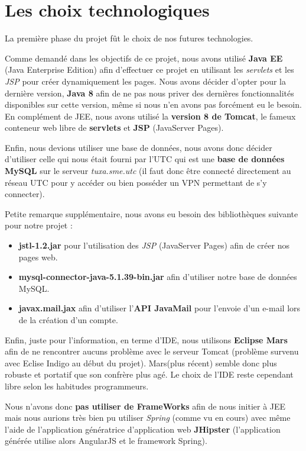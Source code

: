 \documentclass[a4paper]{article}
\begin{document}
\section{Les choix technologiques}
\label{sec:introduction}

La première phase du projet fût le choix de nos futures technologies.

Comme demandé dans les objectifs de ce projet, nous avons utilisé \textbf{Java EE} (Java Enterprise Edition) afin d'effectuer ce projet en utilisant les \textit{servlets} et les \textit{JSP} pour créer dynamiquement les pages. Nous avons décider d'opter pour la dernière version, \textbf{Java 8} afin de ne pas nous priver des dernières fonctionnalités disponibles sur cette version, même si nous n'en avons pas forcément eu le besoin.
En complément de JEE, nous avons utilisé la \textbf{version 8 de Tomcat}, le fameux conteneur web libre de \textbf{servlets} et \textbf{JSP} (JavaServer Pages).

Enfin, nous devions utiliser une base de données, nous avons donc décider d'utiliser celle qui nous était fourni par l'UTC qui est une \textbf{base de données MySQL} sur le serveur \textit{tuxa.sme.utc} (il faut donc être connecté directement au réseau UTC pour y accéder ou bien posséder un VPN permettant de s'y connecter).

Petite remarque supplémentaire, nous avons eu besoin des bibliothèques suivante pour notre projet :
\begin{itemize}
\item \textbf{jstl-1.2.jar} pour l'utilisation des \textit{JSP} (JavaServer Pages) afin de créer nos pages web.
\item \textbf{mysql-connector-java-5.1.39-bin.jar} afin d'utiliser notre base de données MySQL.
\item \textbf{javax.mail.jax} afin d'utiliser l'\textbf{API JavaMail} pour l'envoie d'un e-mail lors de la création d'un compte.
\end{itemize}

Enfin, juste pour l'information, en terme d'IDE, nous utilisons \textbf{Eclipse Mars} afin de ne rencontrer aucuns problème avec le serveur Tomcat (problème survenu avec Eclise Indigo au début du projet). Mars(plus récent) semble donc plus robuste et portatif que son confrère plus agé. Le choix de l'IDE reste cependant libre selon les habitudes programmeurs.

Nous n'avons donc \textbf{pas utiliser de FrameWorks} afin de nous initier à JEE mais nous aurions très bien pu utiliser \textit{Spring} (comme vu en cours) avec même l'aide de l'application génératrice d'application web \textbf{JHipster} (l'application générée utilise alors AngularJS et le framework Spring).
\end{document}
